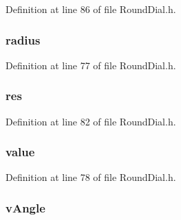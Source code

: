 Definition at line 86 of file Round\+Dial.\+h.

\hypertarget{struct_r_o_u_n_d_d_i_a_l_ae5bf5300978dec1b6c69ee537e1c98f8}{}
\subsubsection[{radius}]{ radius}\label{struct_r_o_u_n_d_d_i_a_l_ae5bf5300978dec1b6c69ee537e1c98f8}


Definition at line 77 of file Round\+Dial.\+h.

\hypertarget{struct_r_o_u_n_d_d_i_a_l_a1d4f80e34e247c9f341f610949618958}{}
\subsubsection[{res}]{ res}\label{struct_r_o_u_n_d_d_i_a_l_a1d4f80e34e247c9f341f610949618958}


Definition at line 82 of file Round\+Dial.\+h.

\hypertarget{struct_r_o_u_n_d_d_i_a_l_ac4d3490391236691d132e3085e887474}{}
\subsubsection[{value}]{ value}\label{struct_r_o_u_n_d_d_i_a_l_ac4d3490391236691d132e3085e887474}


Definition at line 78 of file Round\+Dial.\+h.

\hypertarget{struct_r_o_u_n_d_d_i_a_l_a6d06b2de8d38a5dbaae387a0982d31c0}{}
\subsubsection[{v\+Angle}]{ v\+Angle}\label{struct_r_o_u_n_d_d_i_a_l_a6d06b2de8d38a5dbaae387a0982d31c0}


